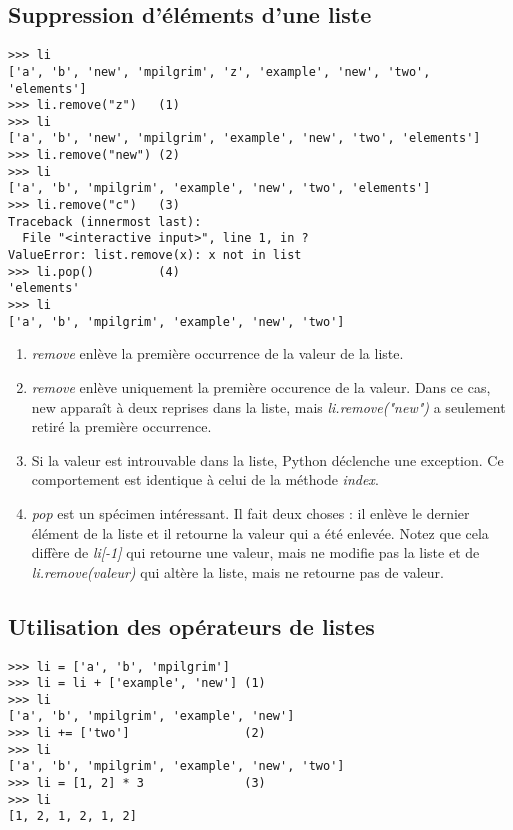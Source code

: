\subsection{Suppression d'éléments d'une liste}

\begin{example}
\begin{lstlisting}
>>> li
['a', 'b', 'new', 'mpilgrim', 'z', 'example', 'new', 'two', 'elements']
>>> li.remove("z")   (1)
>>> li
['a', 'b', 'new', 'mpilgrim', 'example', 'new', 'two', 'elements']
>>> li.remove("new") (2)
>>> li
['a', 'b', 'mpilgrim', 'example', 'new', 'two', 'elements']
>>> li.remove("c")   (3)
Traceback (innermost last):
  File "<interactive input>", line 1, in ?
ValueError: list.remove(x): x not in list
>>> li.pop()         (4)
'elements'
>>> li
['a', 'b', 'mpilgrim', 'example', 'new', 'two']
\end{lstlisting}
\end{example}

\begin{enumerate}
\item{\emph{remove} enlève la première occurrence de la valeur de la liste.}
\item{\emph{remove} enlève uniquement la première occurence de la valeur. Dans ce cas, new apparaît à deux reprises dans la liste, mais \emph{li.remove("new")} a seulement retiré la première occurrence.}
\item{Si la valeur est introuvable dans la liste, Python déclenche une exception. Ce comportement est identique à celui de la méthode \emph{index}.}
\item{\emph{pop} est un spécimen intéressant. Il fait deux choses : il enlève le dernier élément de la liste et il retourne la valeur qui a été enlevée. Notez que cela diffère de \emph{li[-1]} qui retourne une valeur, mais ne modifie pas la liste  et de \emph{li.remove(valeur)} qui altère la liste, mais ne retourne pas de valeur.}
\end{enumerate}

\subsection{Utilisation des opérateurs de listes}

\begin{example}
\begin{lstlisting}
>>> li = ['a', 'b', 'mpilgrim']
>>> li = li + ['example', 'new'] (1)
>>> li
['a', 'b', 'mpilgrim', 'example', 'new']
>>> li += ['two']                (2)
>>> li
['a', 'b', 'mpilgrim', 'example', 'new', 'two']
>>> li = [1, 2] * 3              (3)
>>> li
[1, 2, 1, 2, 1, 2]
\end{lstlisting}
\end{example}

